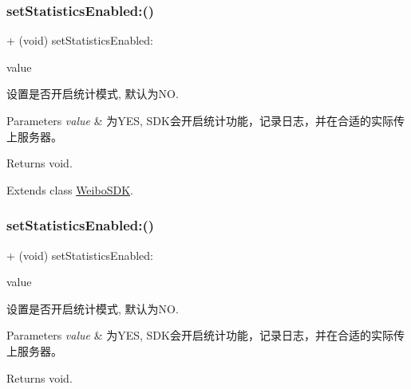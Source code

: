 \subsubsection{\texorpdfstring{set\+Statistics\+Enabled\+:()}{setStatisticsEnabled:()}\hspace{0.1cm}{\footnotesize\ttfamily [1/3]}}
{\footnotesize\ttfamily + (void) set\+Statistics\+Enabled\+: \begin{DoxyParamCaption}\item[{(B\+O\+OL)}]{value }\end{DoxyParamCaption}}

设置是否开启统计模式, 默认为\+NO. 
\begin{DoxyParams}{Parameters}
{\em value} & 为\+Y\+ES, S\+D\+K会开启统计功能，记录日志，并在合适的实际传上服务器。 \\
\hline
\end{DoxyParams}
\begin{DoxyReturn}{Returns}
void. 
\end{DoxyReturn}


Extends class \mbox{\hyperlink{interface_weibo_s_d_k_a0b32ee3e2b30059b93e7dea204b43818}{Weibo\+S\+DK}}.

\mbox{\label{category_weibo_s_d_k_07_statistics_08_a0b32ee3e2b30059b93e7dea204b43818}} 
\subsubsection{\texorpdfstring{set\+Statistics\+Enabled\+:()}{setStatisticsEnabled:()}\hspace{0.1cm}{\footnotesize\ttfamily [2/3]}}
{\footnotesize\ttfamily + (void) set\+Statistics\+Enabled\+: \begin{DoxyParamCaption}\item[{(B\+O\+OL)}]{value }\end{DoxyParamCaption}}

设置是否开启统计模式, 默认为\+NO. 
\begin{DoxyParams}{Parameters}
{\em value} & 为\+Y\+ES, S\+D\+K会开启统计功能，记录日志，并在合适的实际传上服务器。 \\
\hline
\end{DoxyParams}
\begin{DoxyReturn}{Returns}
void. 
\end{DoxyReturn}


